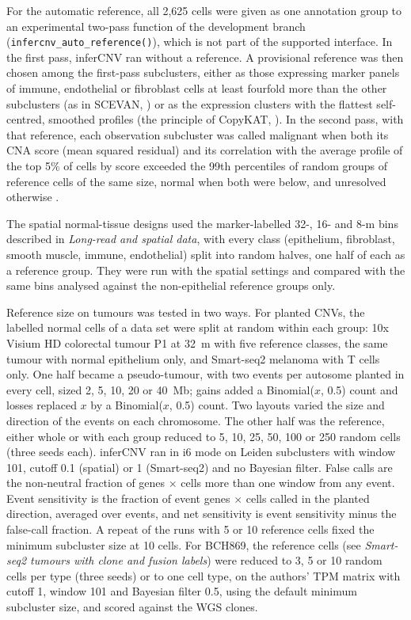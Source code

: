 For the automatic reference, all 2,625 cells were given as one annotation group to an experimental two-pass function of the development branch (\texttt{infercnv\_auto\_reference()}), which is not part of the supported interface. In the first pass, inferCNV ran without a reference. A provisional reference was then chosen among the first-pass subclusters, either as those expressing marker panels of immune, endothelial or fibroblast cells at least fourfold more than the other subclusters (as in SCEVAN, \citealp{defalco2023}) or as the expression clusters with the flattest self-centred, smoothed profiles (the principle of CopyKAT, \citealp{gao2021copykat}). In the second pass, with that reference, each observation subcluster was called malignant when both its CNA score (mean squared residual) and its correlation with the average profile of the top 5\% of cells by score exceeded the 99th percentiles of random groups of reference cells of the same size, normal when both were below, and unresolved otherwise \citep{tirosh2016oligo, puram2017}.

The spatial normal-tissue designs used the marker-labelled 32-, 16- and 8-\textmu m bins described in \emph{Long-read and spatial data}, with every class (epithelium, fibroblast, smooth muscle, immune, endothelial) split into random halves, one half of each as a reference group. They were run with the spatial settings and compared with the same bins analysed against the non-epithelial reference groups only.

Reference size on tumours was tested in two ways. For planted CNVs, the labelled normal cells of a data set were split at random within each group: 10x Visium HD colorectal tumour P1 at 32~\textmu m with five reference classes, the same tumour with normal epithelium only, and Smart-seq2 melanoma \citep{tirosh2016melanoma} with T cells only. One half became a pseudo-tumour, with two events per autosome planted in every cell, sized 2, 5, 10, 20 or 40~Mb; gains added a Binomial($x$, 0.5) count and losses replaced $x$ by a Binomial($x$, 0.5) count. Two layouts varied the size and direction of the events on each chromosome. The other half was the reference, either whole or with each group reduced to 5, 10, 25, 50, 100 or 250 random cells (three seeds each). inferCNV ran in i6 mode on Leiden subclusters with window 101, cutoff 0.1 (spatial) or 1 (Smart-seq2) and no Bayesian filter. False calls are the non-neutral fraction of genes $\times$ cells more than one window from any event. Event sensitivity is the fraction of event genes $\times$ cells called in the planted direction, averaged over events, and net sensitivity is event sensitivity minus the false-call fraction. A repeat of the runs with 5 or 10 reference cells fixed the minimum subcluster size at 10 cells. For BCH869, the reference cells (see \emph{Smart-seq2 tumours with clone and fusion labels}) were reduced to 3, 5 or 10 random cells per type (three seeds) or to one cell type, on the authors' TPM matrix with cutoff 1, window 101 and Bayesian filter 0.5, using the default minimum subcluster size, and scored against the WGS clones.

